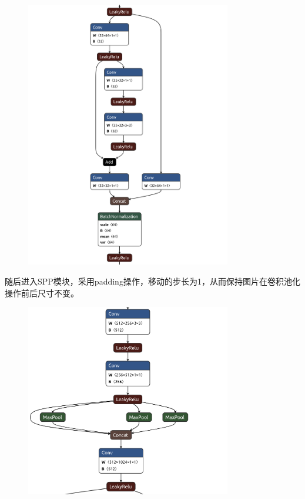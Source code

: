 \documentclass{article}
\begin{document}
\begin{figure}[H]
    \centering
    \includegraphics[width=0.8\textwidth]{figures/yolov5-structure-3.png}
\end{figure}

随后进入SPP模块，采用padding操作，移动的步长为1，从而保持图片在卷积池化操作前后尺寸不变。

\begin{figure}[H]
    \centering
    \includegraphics[width=0.8\textwidth]{figures/yolov5-structure-4.png}
\end{figure}
\end{document}
